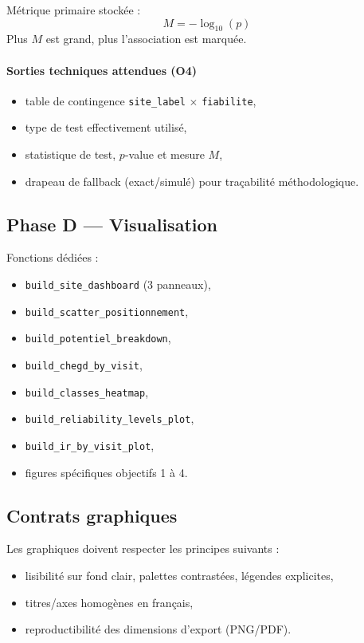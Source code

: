 \documentclass[11pt,a4paper]{article}
\begin{document}
Métrique primaire stockée :
\[
M=-\log_{10}(p)
\]
Plus $M$ est grand, plus l'association est marquée.

\paragraph{Sorties techniques attendues (O4)}
\begin{itemize}[leftmargin=1.2cm]
  \item table de contingence \texttt{site\_label} $\times$ \texttt{fiabilite},
  \item type de test effectivement utilisé,
  \item statistique de test, $p$-value et mesure $M$,
  \item drapeau de fallback (exact/simulé) pour traçabilité méthodologique.
\end{itemize}

\subsection{Phase D --- Visualisation}
Fonctions dédiées :
\begin{itemize}[leftmargin=1.2cm]
  \item \texttt{build\_site\_dashboard} (3 panneaux),
  \item \texttt{build\_scatter\_positionnement},
  \item \texttt{build\_potentiel\_breakdown},
  \item \texttt{build\_chegd\_by\_visit},
  \item \texttt{build\_classes\_heatmap},
  \item \texttt{build\_reliability\_levels\_plot},
  \item \texttt{build\_ir\_by\_visit\_plot},
  \item figures spécifiques objectifs 1 à 4.
\end{itemize}

\subsection{Contrats graphiques}
Les graphiques doivent respecter les principes suivants :
\begin{itemize}[leftmargin=1.2cm]
  \item lisibilité sur fond clair, palettes contrastées, légendes explicites,
  \item titres/axes homogènes en français,
  \item reproductibilité des dimensions d'export (PNG/PDF).
\end{itemize}
\end{document}
